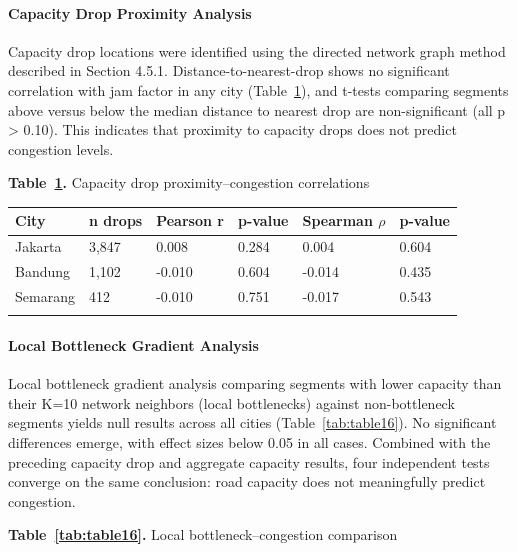 \documentclass[12pt,a4paper]{article}
\begin{document}
\paragraph{Capacity Drop Proximity Analysis}

Capacity drop locations were identified using the directed network graph method described in Section 4.5.1. Distance-to-nearest-drop shows no significant correlation with jam factor in any city (Table~\ref{tab:table15}), and t-tests comparing segments above versus below the median distance to nearest drop are non-significant (all p > 0.10). This indicates that proximity to capacity drops does not predict congestion levels.

\textbf{Table~\ref{tab:table15}.} Capacity drop proximity--congestion correlations

\begin{longtable}[]{@{}llllll@{}}
\toprule\noalign{}
City & n drops & Pearson r & p-value & Spearman $\rho$ & p-value \\
\midrule\noalign{}
\endhead
\bottomrule\noalign{}
\endlastfoot
Jakarta & 3,847 & 0.008 & 0.284 & 0.004 & 0.604 \\
Bandung & 1,102 & -0.010 & 0.604 & -0.014 & 0.435 \\
Semarang & 412 & -0.010 & 0.751 & -0.017 & 0.543 \\
\label{tab:table15}
\end{longtable}

\paragraph{Local Bottleneck Gradient Analysis}

Local bottleneck gradient analysis comparing segments with lower capacity than their K=10 network neighbors (local bottlenecks) against non-bottleneck segments yields null results across all cities (Table~\ref{tab:table16}). No significant differences emerge, with effect sizes below 0.05 in all cases. Combined with the preceding capacity drop and aggregate capacity results, four independent tests converge on the same conclusion: road capacity does not meaningfully predict congestion.

\textbf{Table~\ref{tab:table16}.} Local bottleneck--congestion comparison
\end{document}
